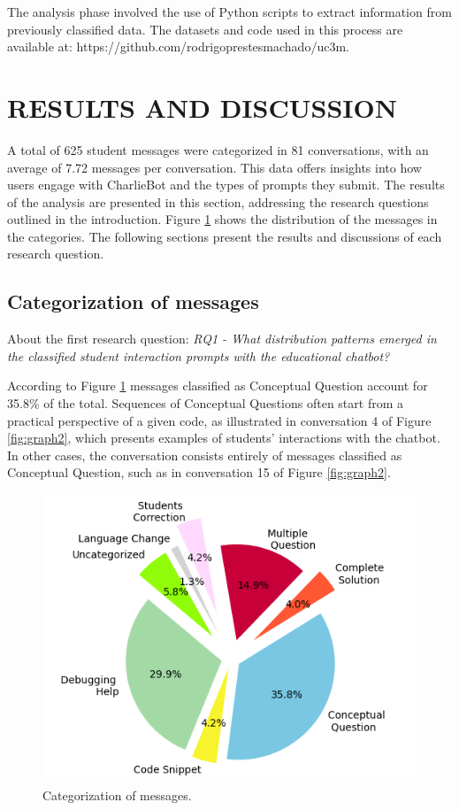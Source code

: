 \documentclass[a4paper,twoside]{article}
\begin{document}
The analysis phase involved the use of Python scripts to extract information
from previously classified data. The datasets and code used in this process are
available at: https://github.com/rodrigoprestesmachado/uc3m.

\section{\uppercase{Results and Discussion}}

A total of 625 student messages were categorized in 81 conversations, with
an average of 7.72 messages per conversation. This data offers insights into how
users engage with CharlieBot and the types of prompts they submit. The results
of the analysis are presented in this section, addressing the research questions
outlined in the introduction. Figure \ref{fig:graph1} shows the distribution of
the messages in the categories. The following sections present the results and
discussions of each research question.

\subsection{Categorization of messages}

About the first research question: \textit{RQ1 - What distribution patterns
emerged in the classified student interaction prompts with the educational
chatbot?}

According to Figure \ref{fig:graph1} messages classified as
Conceptual Question account for 35.8\% of the total. Sequences of Conceptual
Questions often start from a practical perspective of a given code, as
illustrated in conversation 4 of Figure \ref{fig:graph2}, which presents
examples of students' interactions with the chatbot. In other cases, the
conversation consists entirely of messages classified as Conceptual Question,
such as in conversation 15 of Figure \ref{fig:graph2}.

\begin{figure}[h!]
  \centering
  \includegraphics[scale=0.62]{img/figure1.png}
  \caption{Categorization of messages.}
  \label{fig:graph1}
\end{figure}
\end{document}
